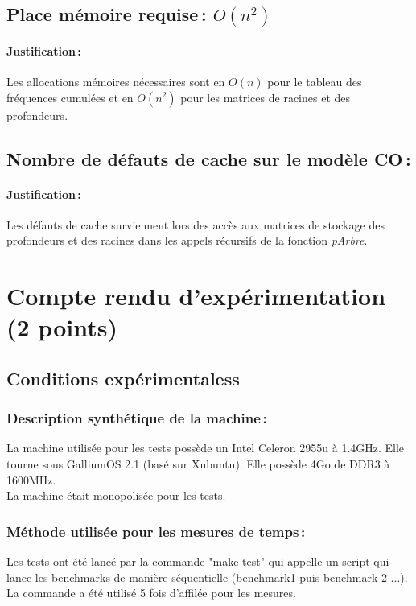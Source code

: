 \documentclass[a4paper, 10pt, french]{article}
\begin{document}
  \subsection{Place mémoire requise\,: $O(n^2)$}
    \paragraph{Justification\,: } Les allocations mémoires nécessaires sont en $O(n)$ pour le tableau des fréquences cumulées et en $O(n^2)$ pour les matrices de racines et des profondeurs.

  \subsection{Nombre de défauts de cache sur le modèle CO\,: }
    \paragraph{Justification\,: } Les défauts de cache surviennent lors des accès aux matrices de stockage des profondeurs et des racines dans les appels récursifs de la fonction \emph{pArbre}.


\section{Compte rendu d'expérimentation (2 points)}
  \subsection{Conditions expérimentaless}

    \subsubsection{Description synthétique de la machine\,:} 
	La machine utilisée pour les tests possède un Intel Celeron 2955u à 1.4GHz. Elle tourne sous GalliumOS 2.1 (basé sur Xubuntu). Elle possède 4Go de DDR3 à 1600MHz. \\
	La machine était monopolisée pour les tests.

    \subsubsection{Méthode utilisée pour les mesures de temps\,: } 
    Les tests ont été lancé par la commande "make test" qui appelle un script qui lance les benchmarks de manière séquentielle (benchmark1 puis benchmark 2 ...).
    La commande a été utilisé 5 fois d'affilée pour les mesures.\\
    
\end{document}
